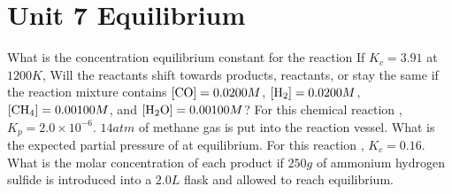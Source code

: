 \documentclass[../main.tex]{subfiles}
\begin{document}
\section{Unit 7 Equilibrium}
\ProblemSet
What is the concentration equilibrium constant for the reaction 
\ProblemSet
If \(K_c = 3.91\) at \(1200K\), Will the reactants shift towards products, reactants, or stay the same if the reaction mixture contains \([\ce{CO}] = 0.0200M\), \([\ce{H2}] = 0.0200M\), \([\ce{CH4}] = 0.00100M\), and \([\ce{H2O}] = 0.00100M\)?
\ProblemSet 
For this chemical reaction , \(K_p = 2.0\times 10^{-6}\). \(14 atm\) of methane gas is put into the reaction vessel. What is the expected partial pressure of  at equilibrium. 
\ProblemSet
For this reaction , \(K_c = 0.16\). What is the molar concentration of each product if \(250g\) of ammonium hydrogen sulfide is introduced into a \(2.0L\) flask and allowed to reach equilibrium. 
\end{document}
